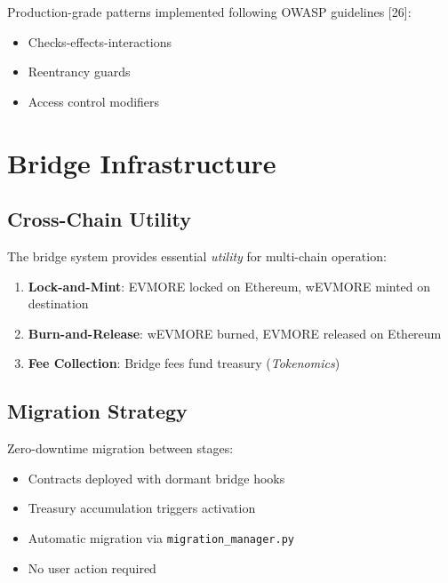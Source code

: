 \documentclass[11pt,a4paper]{article}
\begin{document}
Production-grade patterns implemented following OWASP guidelines [26]:
\begin{itemize}
    \item Checks-effects-interactions
    \item Reentrancy guards
    \item Access control modifiers
\end{itemize}

\section{Bridge Infrastructure}

\subsection{Cross-Chain Utility}

The bridge system provides essential \textit{utility} for multi-chain operation:

\begin{enumerate}
    \item \textbf{Lock-and-Mint}: EVMORE locked on Ethereum, wEVMORE minted on destination
    \item \textbf{Burn-and-Release}: wEVMORE burned, EVMORE released on Ethereum
    \item \textbf{Fee Collection}: Bridge fees fund treasury (\textit{Tokenomics})
\end{enumerate}

\subsection{Migration Strategy}

Zero-downtime migration between stages:

\begin{itemize}
    \item Contracts deployed with dormant bridge hooks
    \item Treasury accumulation triggers activation
    \item Automatic migration via \texttt{migration\_manager.py}
    \item No user action required
\end{itemize}

\end{document}
